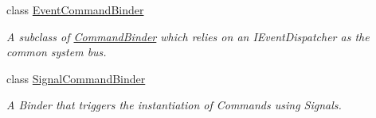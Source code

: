 \begin{DoxyCompactItemize}
class \hyperlink{classstrange_1_1extensions_1_1command_1_1impl_1_1_event_command_binder}{Event\-Command\-Binder}
\begin{DoxyCompactList}\small\item\em A subclass of \hyperlink{classstrange_1_1extensions_1_1command_1_1impl_1_1_command_binder}{Command\-Binder} which relies on an I\-Event\-Dispatcher as the common system bus. \end{DoxyCompactList}\item 
class \hyperlink{classstrange_1_1extensions_1_1command_1_1impl_1_1_signal_command_binder}{Signal\-Command\-Binder}
\begin{DoxyCompactList}\small\item\em A Binder that triggers the instantiation of Commands using Signals. \end{DoxyCompactList}\end{DoxyCompactItemize}
